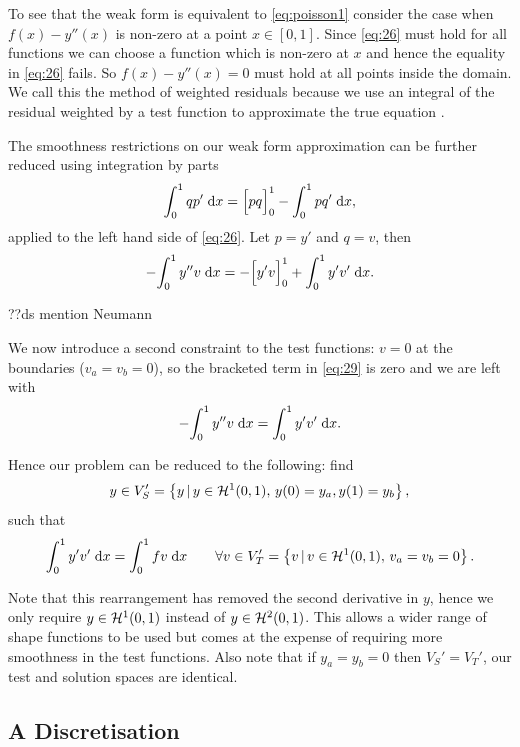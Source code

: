 To see that the weak form is equivalent to \cref{eq:poisson1} consider the case when $f(x) - y''(x)$ is non-zero at a point $x \in [0,1]$. 
Since \cref{eq:26} must hold for all functions we can choose a function which is non-zero at $x$ and hence the equality in \cref{eq:26} fails.
So $f(x) - y''(x) = 0$ must hold at all points inside the domain.
We call this the method of weighted residuals because we use an integral of the residual weighted by a test function to approximate the true equation \cite[210, 214]{Zeinkiewicz1967}.

The smoothness restrictions on our weak form approximation can be further reduced using integration by parts
\begin{equation}
  {\int_0^1 qp' {\; \text{d}}{x}} = \Big[ pq \Big]_{0}^{1} - {\int_0^1 p q' {\; \text{d}}{x}},
\end{equation}
applied to the left hand side of \cref{eq:26}.
Let $p=y'$ and $q=v$, then
\begin{equation}
  -{\int_0^1  y''v  {\; \text{d}}{x}} = -\Big[ y'v \Big]_{0}^{1} + {\int_0^1  y'v'  {\; \text{d}}{x}}.
  \label{eq:29}
\end{equation}

??ds mention Neumann

We now introduce a second constraint to the test functions: $v=0$
at the boundaries (\ie $v_a=v_b=0$), so the bracketed term in \cref{eq:29} is
zero and we are left with
\begin{equation}
  -{\int_0^1  y''v  {\; \text{d}}{x}} = {\int_0^1  y'v'  {\; \text{d}}{x}}.
\end{equation}

Hence our problem can be reduced to the following: find 
\begin{equation}
y\in V_{S}'=\left\{ {y \,|\, y \in \mathcal{H}^1(0,1),\, y(0) = y_a, y(1) = y_b } \right\},
\end{equation}
such that
\begin{equation}
  {\int_0^1  y'v'  {\; \text{d}}{x}} = {\int_0^1  fv  {\; \text{d}}{x}} \qquad 
  \forall v \in V'_{T} = \left\{ {v \,|\, v \in \mathcal{H}^1(0,1),\, v_a=v_b=0} \right\}.
  \label{eq:symmetric-weak-poisson}
\end{equation}

Note that this rearrangement has removed the second derivative in $y$, hence we only require $y \in \mathcal{H}^1(0,1)$ instead of $y \in \mathcal{H}^2(0,1)$.
This allows a wider range of shape functions to be used but comes at the expense of requiring more smoothness in the test functions.
Also note that if $y_a = y_b = 0$ then $V_{S}'=V_{T}'$, our test and solution spaces are identical.

\subsection{A Discretisation}


